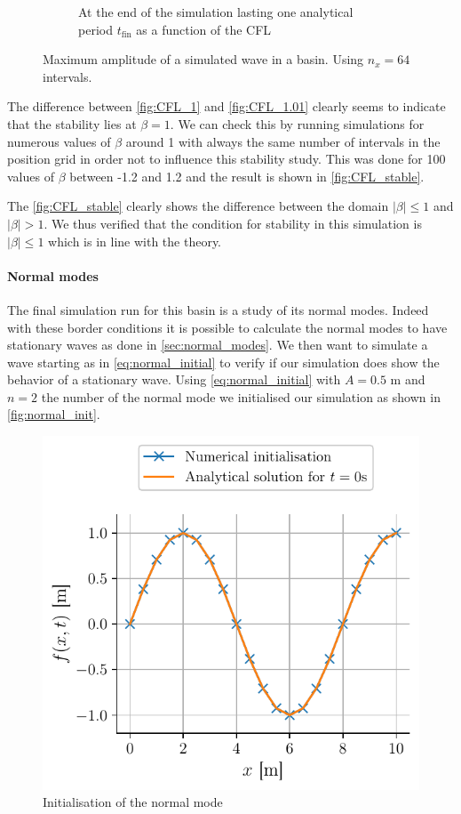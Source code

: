 \begin{figure}
\begin{subfigure}{0.48\linewidth}
        \caption{At the end of the simulation lasting one analytical period $t_\mathrm{fin}$ as a function of the CFL}
        \label{fig:CFL_stable}
    \end{subfigure}
    \caption{Maximum amplitude of a simulated wave in a basin. Using \(n_x=64\) intervals.}
\end{figure}


The difference between \autoref{fig:CFL_1} and \autoref{fig:CFL_1.01} clearly seems to indicate that the stability lies at $\beta = 1$. We can check this by running simulations for numerous values of $\beta$ around 1 with always the same number of intervals in the position grid in order not to influence this stability study. This was done for 100 values of $\beta$ between -1.2 and 1.2 and the result is shown in \autoref{fig:CFL_stable}.

The \autoref{fig:CFL_stable} clearly shows the difference between the domain $|\beta| \leq 1$ and $|\beta| > 1$. We thus verified that the condition for stability in this simulation is $|\beta| \leq 1$ which is in line with the theory.


\paragraph{Normal modes} The final simulation run for this basin is a study of its normal modes. Indeed with these border conditions it is possible to calculate the normal modes to have stationary waves as done in \autoref{sec:normal_modes}. We then want to simulate a wave starting as in \autoref{eq:normal_initial} to verify if our simulation does show the behavior of a stationary wave. Using \autoref{eq:normal_initial} with $A = 0.5$ \si{\meter} and $n = 2$ the number of the normal mode we initialised our simulation as shown in \autoref{fig:normal_init}.
\begin{figure}[h]
    \centering
    \includegraphics*[width=0.6\linewidth]{figures/bassin_mode_start.pdf}
    \caption{Initialisation of the normal mode}
    \label{fig:normal_init}
\end{figure}

